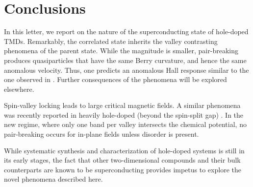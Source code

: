 \section{Conclusions}

In this letter, we report on the nature of the superconducting state
of hole-doped TMDs.
Remarkably, the correlated state inherits
the valley contrasting phenomena of the parent state.
While the magnitude is smaller, pair-breaking produces quasiparticles
that have the same Berry curvature, and hence the same anomalous velocity.
Thus, one predicts an anomalous Hall response similar to
the one observed in .
Further consequences of the phenomena will be explored elsewhere.

Spin-valley locking leads to large critical magnetic fields.
A similar phenomena was recently reported in heavily hole-doped
(beyond the spin-split gap) 
\cite{%
  1510.06289v2,%
  PhysRevLett.113.097001%
}.
In the new regime, where only one band per valley intersects
the chemical potential, no pair-breaking occurs
for in-plane fields unless disorder is present.

While systematic synthesis and characterization of hole-doped systems
is still in its early stages, the fact that other two-dimensional compounds
and their bulk counterparts are known to be superconducting
provides impetus to explore the novel phenomena described here.
